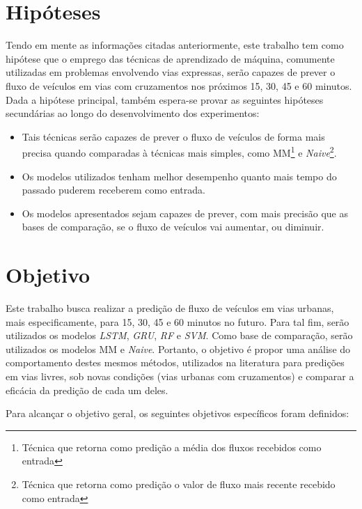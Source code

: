 \section{Hipóteses}
\label{chapter:hipoteses}
Tendo em mente as informações citadas anteriormente, este trabalho tem como hipótese que o emprego das técnicas de aprendizado de máquina, comumente utilizadas em problemas envolvendo vias expressas, serão capazes de prever o fluxo de veículos em vias com cruzamentos nos próximos 15, 30, 45 e 60 minutos. Dada a hipótese principal, também espera-se provar as seguintes hipóteses secundárias ao longo do desenvolvimento dos experimentos:

\begin{itemize}
    \item Tais técnicas serão capazes de prever o fluxo de veículos de forma mais precisa quando comparadas à técnicas mais simples, como \acrfull{MM}\footnote{Técnica que retorna como predição a média dos fluxos recebidos como entrada} e \textit{Naive}\footnote{Técnica que retorna como predição o valor de fluxo mais recente recebido como entrada}.
    \item Os modelos utilizados tenham melhor desempenho quanto mais tempo do passado puderem receberem como entrada.
    \item Os modelos apresentados sejam capazes de prever, com mais precisão que as bases de comparação, se o fluxo de veículos vai aumentar, ou diminuir.
\end{itemize}


\section{Objetivo}
\label{section:objectives}
Este trabalho busca realizar a predição de fluxo de veículos em vias urbanas, mais especificamente, para 15, 30, 45 e 60 minutos no futuro. Para tal fim, serão utilizados os modelos \textit{\acrfull{LSTM}}, \textit{\acrfull{GRU}}, \textit{\acrfull{RF}} e \textit{\acrfull{SVM}}. Como base de comparação, serão utilizados os modelos \acrshort{MM} e \textit{Naive}. Portanto, o objetivo é propor uma análise do comportamento destes mesmos métodos, utilizados na literatura para predições em vias livres, sob novas condições (vias urbanas com cruzamentos) e comparar a eficácia da predição de cada um deles.

Para alcançar o objetivo geral, os seguintes objetivos específicos foram definidos:

